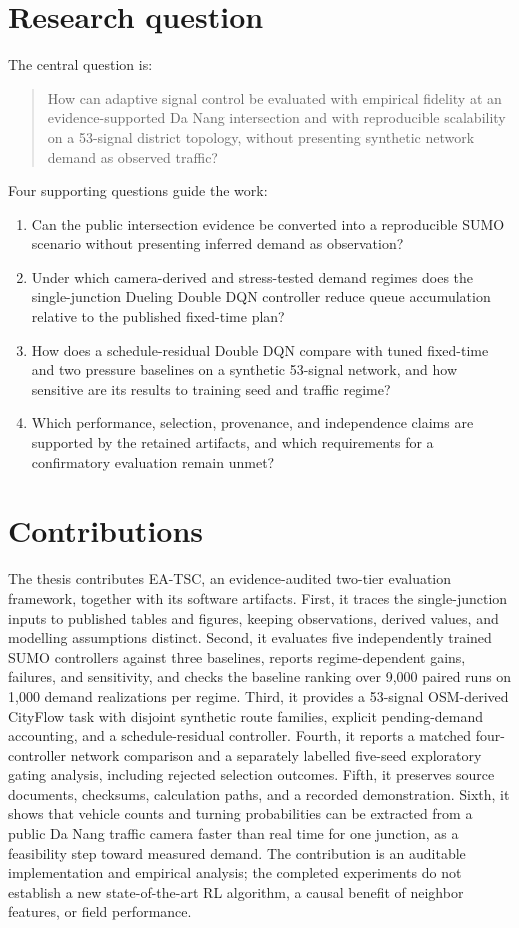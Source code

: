 \documentclass[12pt,a4paper]{report}
\newcommand{\ddqn}{Dueling Double DQN}
\newcommand{\methodname}{EA-TSC}
\begin{document}
\section{Research question}
The central question is:
\begin{quote}
How can adaptive signal control be evaluated with empirical fidelity at an evidence-supported Da Nang intersection and with reproducible scalability on a 53-signal district topology, without presenting synthetic network demand as observed traffic?
\end{quote}
Four supporting questions guide the work:
\begin{enumerate}[label=RQ\arabic*.]
\item Can the public intersection evidence be converted into a reproducible SUMO scenario without presenting inferred demand as observation?
\item Under which camera-derived and stress-tested demand regimes does the single-junction \ddqn{} controller reduce queue accumulation relative to the published fixed-time plan?
\item How does a schedule-residual Double DQN compare with tuned fixed-time and two pressure baselines on a synthetic 53-signal network, and how sensitive are its results to training seed and traffic regime?
\item Which performance, selection, provenance, and independence claims are supported by the retained artifacts, and which requirements for a confirmatory evaluation remain unmet?
\end{enumerate}

\section{Contributions}
The thesis contributes \methodname{}, an evidence-audited two-tier evaluation framework, together with its software artifacts. First, it traces the single-junction inputs to published tables and figures, keeping observations, derived values, and modelling assumptions distinct. Second, it evaluates five independently trained SUMO controllers against three baselines, reports regime-dependent gains, failures, and sensitivity, and checks the baseline ranking over 9,000 paired runs on 1,000 demand realizations per regime. Third, it provides a 53-signal OSM-derived CityFlow task with disjoint synthetic route families, explicit pending-demand accounting, and a schedule-residual controller. Fourth, it reports a matched four-controller network comparison and a separately labelled five-seed exploratory gating analysis, including rejected selection outcomes. Fifth, it preserves source documents, checksums, calculation paths, and a recorded demonstration. Sixth, it shows that vehicle counts and turning probabilities can be extracted from a public Da Nang traffic camera faster than real time for one junction, as a feasibility step toward measured demand. The contribution is an auditable implementation and empirical analysis; the completed experiments do not establish a new state-of-the-art RL algorithm, a causal benefit of neighbor features, or field performance.
\end{document}
